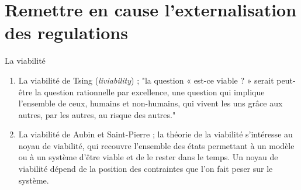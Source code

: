 \documentclass[newPxFont]{beamer}
\begin{document}

\section{Remettre en cause l'externalisation des regulations}

\begin{frame}[c]{La viabilité}
  \vspace{-1cm}
  \begin{enumerate}
    \item La viabilité de Tsing (\textit{liviability}) ; "la question « est-ce viable ? » serait peut-être la question rationnelle par excellence, une question qui implique l'ensemble de ceux, humains et non-humains, qui vivent les uns grâce aux autres, par les autres, au risque des autres."
    \item La viabilité de Aubin et Saint-Pierre ; la théorie de la viabilité s’intéresse au noyau de viabilité, qui recouvre l’ensemble des états permettant à un modèle ou à un système d’être viable et de le rester dans le temps. Un noyau de viabilité dépend de la position des contraintes que l’on fait peser sur le système.
  \end{enumerate}
\end{frame}
\end{document}
